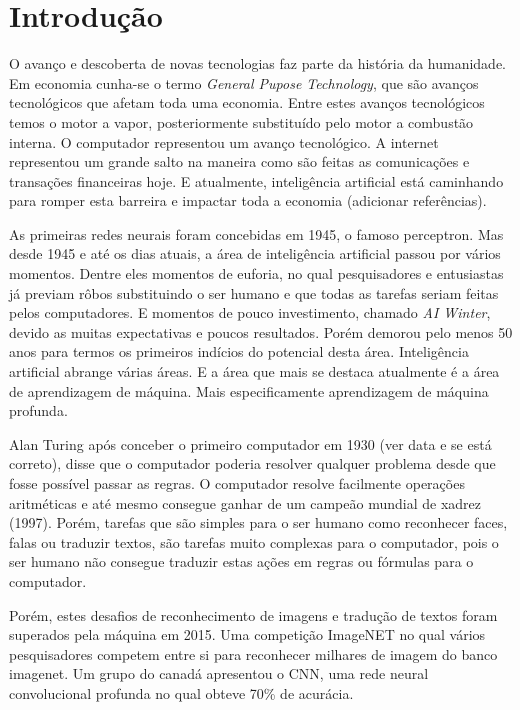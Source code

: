 \chapter{Introdução}
\label{cap:introducao}

O avanço e descoberta de novas tecnologias faz parte da história da humanidade. Em economia cunha-se o termo \textit{General Pupose Technology}, que são avanços tecnológicos que afetam toda uma economia. Entre estes avanços tecnológicos temos o motor a vapor, posteriormente substituído pelo motor a combustão interna. O computador representou um avanço tecnológico. A internet representou um grande salto na maneira como são feitas as comunicações e transações financeiras hoje. E atualmente, inteligência artificial está caminhando para romper esta barreira e impactar toda a economia (adicionar referências).

As primeiras redes neurais foram concebidas em 1945, o famoso perceptron. Mas desde 1945 e até os dias atuais, a área de inteligência artificial passou por vários momentos. Dentre eles momentos de euforia, no qual pesquisadores e entusiastas já previam rôbos substituindo o ser humano e que todas as tarefas seriam feitas pelos computadores. E momentos de pouco investimento, chamado \textit{AI Winter}, devido as muitas expectativas e poucos resultados. Porém demorou pelo menos 50 anos para termos os primeiros indícios do potencial desta área. Inteligência artificial abrange várias áreas. E a área que mais se destaca atualmente é a área de aprendizagem de máquina. Mais especificamente aprendizagem de máquina profunda.

Alan Turing após conceber o primeiro computador em 1930 (ver data e se está correto), disse que o computador poderia resolver qualquer problema desde que fosse possível passar as regras. O computador resolve facilmente operações aritméticas e até mesmo consegue ganhar de um campeão mundial de xadrez (1997). Porém, tarefas que são simples para o ser humano como reconhecer faces, falas ou traduzir textos, são tarefas muito complexas para o computador, pois o ser humano não consegue traduzir estas ações em regras ou fórmulas para o computador.

Porém, estes desafios de reconhecimento de imagens e tradução de textos foram superados pela máquina em 2015. Uma competição ImageNET no qual vários pesquisadores competem entre si para reconhecer milhares de imagem do banco imagenet. Um grupo do canadá apresentou o CNN, uma rede neural convolucional profunda no qual obteve 70\% de acurácia.

